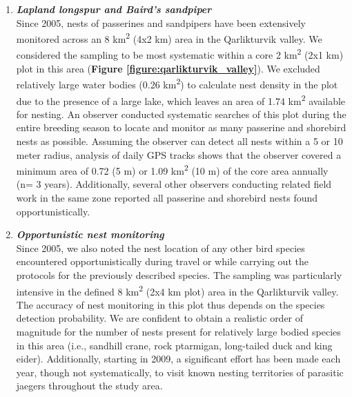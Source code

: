\documentclass[a4paper,twoside,12pt]{article}
\begin{document}
\begin{enumerate}[label=\roman*]
        \item[] \textit{\textbf{Lapland longspur and Baird's sandpiper}}\\
        Since 2005, nests of passerines and sandpipers have been extensively monitored across an 8 km\textsuperscript{2} (4x2 km) area in the Qarlikturvik valley. We considered the sampling to be most systematic within a core 2 km\textsuperscript{2} (2x1 km) plot in this area (\textbf{Figure \ref{figure:qarlikturvik_valley}}). We excluded relatively large water bodies (0.26 km\textsuperscript{2}) to calculate nest density in the plot due to the presence of a large lake, which leaves an area of 1.74 km\textsuperscript{2} available for nesting. An observer conducted systematic searches of this plot during the entire breeding season to locate and monitor as many passerine and shorebird nests as possible. Assuming the observer can detect all nests within a 5 or 10 meter radius, analysis of daily GPS tracks shows that the observer covered a minimum area of 0.72  (5 m) or 1.09  km\textsuperscript{2} (10 m) of the core area annually (n= 3 years). Additionally, several other observers conducting related field work in the same zone reported all passerine and shorebird nests found opportunistically.\\
        
        \item[] \textit{\textbf{Opportunistic nest monitoring}}\\
        Since 2005, we also noted the nest location of any other bird species encountered opportunistically during travel or while carrying out the protocols for the previously described species. The sampling was particularly intensive in the defined 8 km\textsuperscript{2} (2x4 km plot) area in the Qarlikturvik valley. The accuracy of nest monitoring in this plot thus depends on the species detection probability. We are confident to obtain a realistic order of magnitude for the number of nests present for relatively large bodied species in this area (i.e., sandhill crane, rock ptarmigan, long-tailed duck and king eider). Additionally, starting in 2009, a significant effort has been made each year, though not systematically, to visit known nesting territories of parasitic jaegers throughout the study area.
        \end{enumerate}

\newpage
\end{document}

